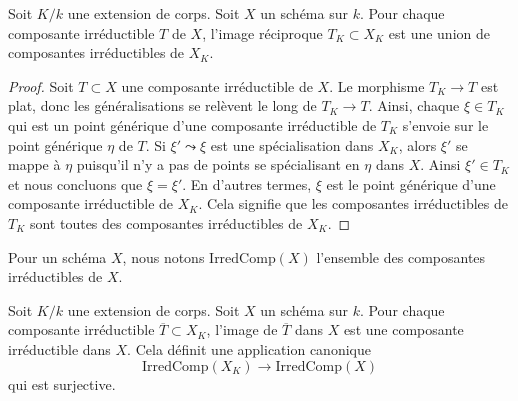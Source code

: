 \begin{lemma}
\label{lemma-inverse-image-irreducible}
Soit $K/k$ une extension de corps.
Soit $X$ un schéma sur $k$. Pour chaque
composante irréductible $T$ de $X$, l'image réciproque $T_K
\subset X_K$ est une union de composantes irréductibles de $X_K$.
\end{lemma}

\begin{proof}
Soit $T \subset X$ une composante irréductible de
$X$. Le morphisme $T_K \to T$ est plat, donc les généralisations
se relèvent le long de $T_K \to T$. Ainsi, chaque $\xi \in T_K$
qui est un point générique d'une composante irréductible de
$T_K$ s'envoie sur le point générique $\eta$ de $T$. Si $\xi'
\leadsto \xi$ est une spécialisation dans $X_K$, alors $\xi'$ se
mappe à $\eta$ puisqu'il n'y a pas de points se spécialisant en
$\eta$ dans $X$. Ainsi $\xi' \in T_K$ et nous concluons que $\xi =
\xi'$. En d'autres termes, $\xi$ est le point générique d'une
composante irréductible de $X_K$. Cela signifie que les composantes
irréductibles de $T_K$ sont toutes des composantes irréductibles de $X_K$.
\end{proof}

\noindent
Pour un schéma $X$, nous notons
$\text{IrredComp}(X)$ l'ensemble des composantes irréductibles de $X$.

\begin{lemma}
\label{lemma-image-irreducible}
Soit $K/k$ une extension de corps.
Soit $X$ un schéma sur $k$. Pour chaque
composante irréductible $\overline{T} \subset X_K$,
l'image de $\overline{T}$ dans $X$ est une composante
irréductible dans $X$. Cela définit une application canonique
$$
\text{IrredComp}(X_K)
\longrightarrow
\text{IrredComp}(X)
$$
qui est surjective.
\end{lemma}

